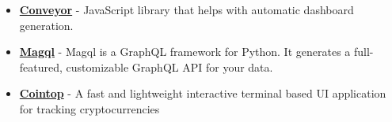 

\begin{itemize}
	\item \href{https://github.com/autoinvent/conveyor}{\textbf{Conveyor}} - JavaScript library that helps with automatic dashboard generation.
	\item \href{https://github.com/autoinvent/magql}{\textbf{Magql}} - Magql is a GraphQL framework for Python. It generates a full-featured, customizable GraphQL API for your data.
	\item \href{https://github.com/cointop-sh/cointop}{\textbf{Cointop}} - A fast and lightweight interactive terminal based UI application for tracking cryptocurrencies
\end{itemize}
